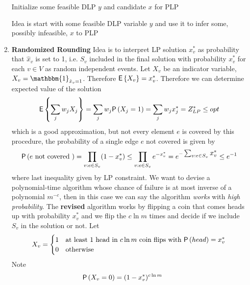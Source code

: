 \documentclass[11pt]{article}
\begin{document}
\begin{enumerate}
    \begin{center}
        \begin{algorithm}[H]
            Initialize some feasible DLP $y$ and candidate $x$ for PLP\\ 
        \end{algorithm}
    \end{center}
    Idea is start with some feasible DLP variable $y$ and use it to infer some, possibly infeasible, $x$ to PLP
    \item \textbf{Randomized Rounding} Idea is to interpret LP solution $x^*_v$ as probability that $\hat{x}_v$ is set to 1, i.e. $S_v$ included in the final solution with probability $x^*_v$ for each $v\in V$ as random independent events. Let $X_v$ be an indicator variable, $X_v = \mathbbm{1}_{\hat{x}_v =1}$. Therefore $\E{X_v} = x_v^*$. Therefore we can determine expected value of the solution 
    \[
        \E{\sum_{j} w_j X_j} = \sum_j w_j \P{X_j=1} = \sum_j w_j x_j^* = Z_{LP}^* \leq opt
    \]
    which is a good approximation, but not every element $e$ is covered by this procedure, the probability of a single edge $e$ not covered is given by 
    \[
        \P{e \text{ not covered }} 
        = \prod_{v: e\in S_v} (1 - x_v^*)
        \leq \prod_{v: e\in S_v} e^{-x_v^*}
        = e^{-\textstyle\sum_{v: e\in S_v} x_v^*} 
        \leq e^{-1}
    \]
    where last inequality given by LP constraint. We want to devise a polynomial-time algorithm whose chance of failure is at most inverse of a polynomial $m^{-c}$, then in this case we can say the algorithm \textit{works} with \textit{high probability}. The \textbf{revised} algorithm works by flipping a coin that comes heads up with probability $x_v^*$ and we flip the $c\ln m$ times and decide if we include $S_v$ in the solution or not. Let 
    \[
        X_v =
        \begin{cases}
            1 & \text{at least 1 head in $c\ln m$ coin flips with } \P{head} = x_v^* \\
            0 & \text{otherwise}
        \end{cases}    
    \]
    Note 
    \[
        \P{X_v=0} = (1 - x_v^*)^{c\ln m} 
        \qquad 
\]
\end{enumerate}
\end{document}
